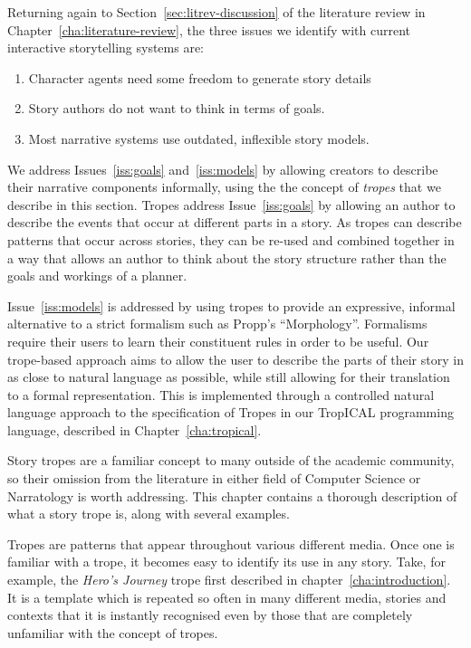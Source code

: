\documentclass[11pt]{report}
\begin{document}
Returning again to Section~\ref{sec:litrev-discussion} of the literature review in
Chapter~\ref{cha:literature-review}, the three issues we identify with current
interactive storytelling systems are:

\begin{enumerate}[{Issue} 1:]
\item Character agents need some freedom to generate story details
\item Story authors do not want to think in terms of goals.
\item Most narrative systems use outdated, inflexible story models.
\end{enumerate}

We address Issues~\ref{iss:goals} and~\ref{iss:models} by allowing creators to
describe their narrative components informally, using the the concept of
\emph{tropes} that we describe in this section. Tropes address
Issue~\ref{iss:goals} by allowing an author to describe the events that occur at
different parts in a story. As tropes can describe patterns that occur across
stories, they can be re-used and combined together in a way that allows an
author to think about the story structure rather than the goals and workings of
a planner.

Issue~\ref{iss:models} is addressed by using tropes to provide an expressive, informal alternative to a strict formalism such as Propp's ``Morphology''. Formalisms require their users to learn their constituent rules in order to be useful. Our trope-based approach aims to allow the user to describe the parts of their story in as close to natural language as possible, while still allowing for their translation to a formal representation.
This is implemented through a controlled natural language approach to the specification of Tropes in our TropICAL programming language, described in Chapter~\ref{cha:tropical}.

Story tropes are a familiar concept to many outside of the academic
community, so their omission from the literature in either field of Computer
Science or Narratology is worth addressing. This chapter contains a thorough
description of what a story trope is, along with several examples.

Tropes are patterns that appear throughout various different media. Once one is familiar
with a trope, it becomes easy to identify its use in any story. Take, for
example, the \emph{Hero's Journey} trope first described in
chapter~\ref{cha:introduction}. It is a template which is repeated so often in
many different media, stories and contexts that it is instantly recognised even
by those that are completely unfamiliar with the concept of tropes.
\end{document}
